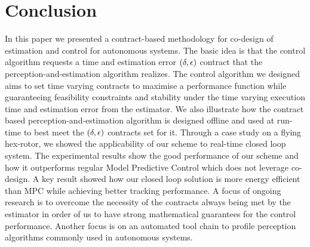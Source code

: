 \section{Conclusion}
\label{conclusion}

In this paper we presented a contract-based methodology for co-design of estimation and control for autonomous systems. 
The basic idea is that the control algorithm requests a time and estimation error $(\delta,\epsilon)$ contract that the perception-and-estimation algorithm realizes. The control algorithm we designed aims to set time varying contracts to maximise a performance function while guaranteeing feasibility constraints and stability under the time varying execution time and estimation error from the estimator. We also illustrate how the contract based perception-and-estimation algorithm is designed offline and used at run-time to best meet the $(\delta,\epsilon)$ contracts set for it. Through a case study on a flying hex-rotor, we showed the applicability of our scheme to real-time closed loop system. The experimental results show the good performance of our scheme and how it outperforms regular Model Predictive Control which does not leverage co-design. A key result showed how our closed loop solution is more energy efficient than MPC while achieving better tracking performance. A focus of ongoing research is to overcome the necessity of the contracts always being met by the estimator in order of us to have strong mathematical guarantees for the control performance. Another focus is on an automated tool chain to profile perception algorithms commonly used in autonomous systems.
